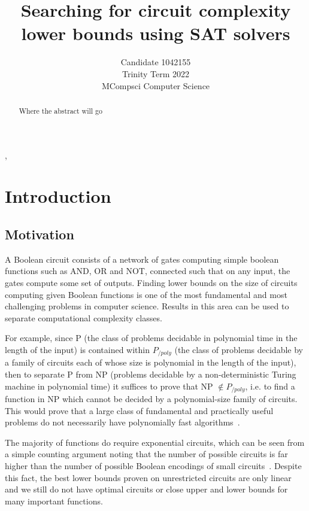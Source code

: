 \documentclass{article}
\begin{document}
\begin{titlepage}
\title{Searching for circuit complexity lower bounds using SAT solvers}
\author{Candidate 1042155\\Trinity Term 2022\\MCompsci Computer Science}
\maketitle
\end{titlepage}

\begin{abstract}
Where the abstract will go
\end{abstract},

\tableofcontents

\section{Introduction}

\subsection{Motivation}

A Boolean circuit consists of a network of gates computing simple boolean functions such as AND, OR and NOT, connected such that on any input, the gates compute some set of outputs. Finding lower bounds on the size of circuits computing given Boolean functions is one of the most fundamental and most challenging problems in computer science. Results in this area can be used to separate computational complexity classes. 

For example, since P (the class of problems decidable in polynomial time in the length of the input) is contained within $P_{/poly}$ (the class of problems decidable by a family of circuits each of whose size is polynomial in the length of the input), then to separate P from NP (problems decidable by a non-deterministic Turing machine in polynomial time) it suffices to prove that NP $\notin P_{/poly}$, i.e. to find a function in NP which cannot be decided by a polynomial-size family of circuits. This would prove that a large class of fundamental and practically useful problems do not necessarily have polynomially fast algorithms~\cite{arora}. 

The majority of functions do require exponential circuits, which can be seen from a simple counting argument noting that the number of possible circuits is far higher than the number of possible Boolean encodings of small circuits~\cite{arora}. Despite this fact, the best lower bounds proven on unrestricted circuits are only linear~\cite{boppana} and we still do not have optimal circuits or close upper and lower bounds for many important functions.
\end{document}
